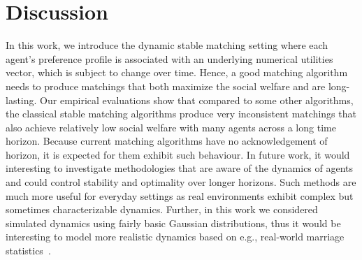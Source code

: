 \section{Discussion}
In this work, we introduce the dynamic stable matching setting where each agent's preference profile is associated with an underlying numerical utilities vector, which is subject to change over time. Hence, a good matching algorithm needs to produce matchings that both maximize the social welfare and are long-lasting. Our empirical evaluations show that compared to some other algorithms, the classical stable matching algorithms produce very inconsistent matchings that also achieve relatively low social welfare with many agents across a long time horizon. Because current matching algorithms have no acknowledgement of horizon, it is expected for them exhibit such behaviour. In future work, it would interesting to investigate methodologies that are aware of the dynamics of agents and could control stability and optimality over longer horizons. Such methods are much more useful for everyday settings as real environments exhibit complex but sometimes characterizable dynamics. Further, in this work we considered simulated dynamics using fairly basic Gaussian distributions, thus it would be interesting to model more realistic dynamics based on e.g., real-world marriage statistics~\cite{lavner2010patterns}.
